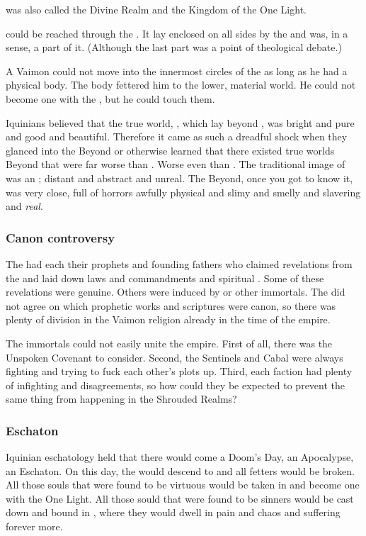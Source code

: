 \Atziluth was also called the Divine Realm and the Kingdom of the One Light. 

\Atziluth could be reached through the . 
It lay enclosed on all sides by the \empyrean and was, in a sense, a part of it. 
(Although the last part was a point of theological debate.)

A Vaimon could not move into the innermost circles of the \empyrean as long as he had a physical body.
The body fettered him to the lower, material world.
He could not become one with the \sephiroth, but he could touch them. 

Iquinians believed that the true world, \Atziluth, which lay beyond \Gehinnom, was bright and pure and good and beautiful. 
Therefore it came as such a dreadful shock when they glanced into the Beyond or otherwise learned that there existed true worlds Beyond that were far worse than \Gehinnom. 
Worse even than \itzach.
The traditional image of \itzach was an ; distant and abstract and unreal. 
The Beyond, once you got to know it, was very close, full of horrors awfully physical and slimy and smelly and slavering and \emph{real}. 





\subsubsection{Canon controversy}
The \VaimonClans had each their prophets and founding fathers who claimed revelations from the \sephiroth and laid down laws and commandments and spiritual .
Some of these revelations were genuine.
Others were induced by \qliphoth or other immortals.
The \vclans did not agree on which prophetic works and scriptures were canon, so there was plenty of division in the Vaimon religion already in the time of the empire.

The immortals could not easily unite the empire.
First of all, there was the Unspoken Covenant to consider.
Second, the Sentinels and Cabal were always fighting and trying to fuck each other's plots up.
Third, each faction had plenty of infighting and disagreements, so how could they be expected to prevent the same thing from happening in the Shrouded Realms?




\subsubsection{Eschaton}
Iquinian eschatology held that there would come a Doom's Day, an Apocalypse, an Eschaton.
On this day, the \sephiroth would descend to \Miith and all fetters would be broken. 
All those souls that were found to be virtuous would be taken in and become one with the One Light.
All those sould that were found to be sinners would be cast down and bound in \itzach, where they would dwell in pain and chaos and suffering forever more. 

